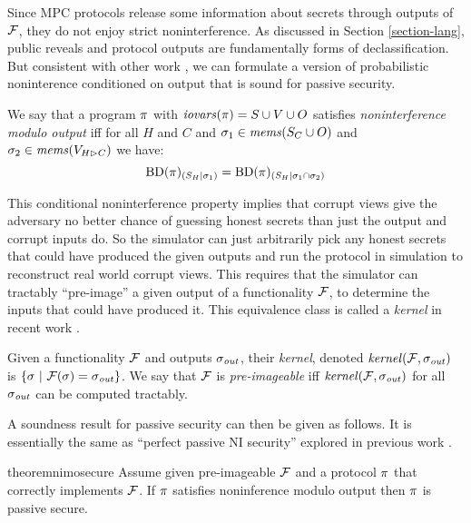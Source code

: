 Since MPC protocols release some information about secrets through
outputs of $\mathcal{F}$, they do not enjoy strict noninterference.  As
discussed in Section \ref{section-lang}, public reveals and protocol
outputs are fundamentally forms of declassification.  But consistent
with other work \cite{8429300}, we can formulate a version of
probabilistic noninterence conditioned on output that is sound
for passive security. 
\begin{definition}
  \label{definition-NIMO}
  We say that a program $\pi$ with $\mathit{iovars}(\pi) = S \cup V \cup O$
  satisfies \emph{noninterference modulo output}
  iff for all $H$ and $C$ and $\sigma_1 \in \mathit{mems}(S_C \cup O)$ and $\sigma_2 \in \mathit{mems}(V_{H \rhd C})$
  we have:
  $$
  \mathrm{BD}(\pi)_{({S_H}|{\sigma_1})} = \mathrm{BD}(\pi)_{({S_H}|{\sigma_1 \cap \sigma_2})}
 $$
\end{definition}
This conditional noninterference property implies that
corrupt views give the adversary no better chance of guessing honest
secrets than just the output and corrupt inputs do. So the simulator
can just arbitrarily pick any honest secrets that could have produced
the given outputs and run the protocol in simulation to reconstruct
real world corrupt views. This requires that the simulator can
tractably ``pre-image'' a given output of a functionality $\mathcal{F}$,
to determine the inputs that could have produced it. This equivalence
class is called a \emph{kernel} in recent work \cite{10.1145/3571740}.
\begin{definition}
  Given a functionality $\mathcal{F}$ and outputs $\sigma_{\mathit{out}}$, their 
  \emph{kernel}, denoted $\mathit{kernel}(\mathcal{F},\sigma_{\mathit{out}})$ is
  $
  \{ \sigma\ |\ \mathcal{F}(\sigma) = \sigma_{\mathit{out}} \}
  $.
  We say that $\mathcal{F}$ is \emph{pre-imageable} iff $\mathit{kernel}(\mathcal{F}, \sigma_{\mathit{out}})$ for all
  $\sigma_{\mathit{out}}$ can be computed tractably.
\end{definition}
A soundness result for passive security can then be given as follows.
It is essentially the same as ``perfect passive NI security'' explored
in previous work \cite{8429300}.  
\begin{restatable}{theorem}{nimosecure}
  \label{theorem-nimo}
  Assume given pre-imageable $\mathcal{F}$ and a protocol $\pi$ that
  correctly implements $\mathcal{F}$.  If $\pi$ satisfies noninference modulo output
  then $\pi$ is passive secure.
\end{restatable}


